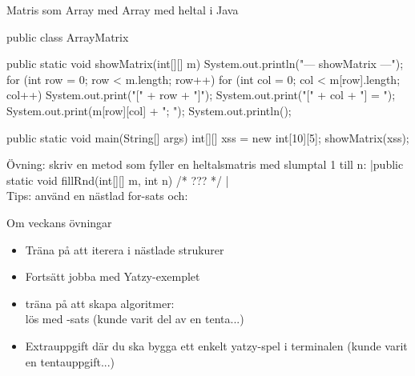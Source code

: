 \begin{Slide}{Matris som Array med Array med heltal i Java}\SlideFontTiny
\begin{CodeSmall}[language=Java]
public class ArrayMatrix {

    public static void showMatrix(int[][] m){
        System.out.println("\n--- showMatrix ---");
        for (int row = 0; row < m.length; row++){
            for (int col = 0; col < m[row].length; col++) {
                System.out.print("[" + row + "]");
                System.out.print("[" + col + "] = ");
                System.out.print(m[row][col] + "; ");
            }
            System.out.println();
        }
    }

    public static void main(String[] args) {
        int[][] xss = new int[10][5];
        showMatrix(xss);
    }
}
\end{CodeSmall}
\pause
Övning: skriv en metod  som fyller en heltalsmatris med slumptal 1 till n:
\pause
\jcode|public static void fillRnd(int[][] m, int n){ /* ??? */ }| \\
\pause
Tips: använd en nästlad for-sats och: \\

\end{Slide}

\begin{Slide}{Om veckans övningar}\SlideFontSmall
\begin{itemize}
\item Träna på att iterera i nästlade strukurer

\item Fortsätt jobba med Yatzy-exemplet

\item träna på att skapa  algoritmer: \\
lös  med -sats (kunde varit del av en tenta...)

\item Extrauppgift där du ska bygga ett enkelt yatzy-spel i terminalen (kunde varit en tentauppgift...)

\end{itemize}
\end{Slide}

